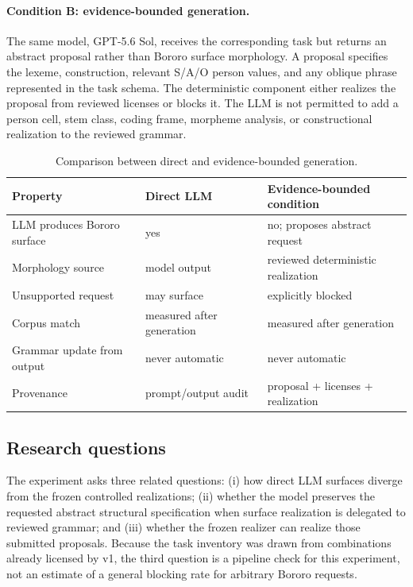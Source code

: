 \documentclass[11pt]{article}
\begin{document}
\paragraph{Condition B: evidence-bounded generation.}
The same model, GPT-5.6 Sol, receives the corresponding task but returns an
abstract proposal rather than Bororo surface morphology. A proposal specifies the lexeme,
construction, relevant S/A/O person values, and any oblique phrase represented
in the task schema. The deterministic component either realizes the proposal
from reviewed licenses or blocks it. The LLM is not permitted to add a person
cell, stem class, coding frame, morpheme analysis, or constructional realization
to the reviewed grammar.

\begin{table}[ht]
\centering
\caption{Comparison between direct and evidence-bounded generation.}
\label{tab:llmexperiment}
\begin{tabular}{p{.28\linewidth}p{.31\linewidth}p{.31\linewidth}}
\toprule
Property & Direct LLM & Evidence-bounded condition\\
\midrule
LLM produces Bororo surface & yes & no; proposes abstract request\\
Morphology source & model output & reviewed deterministic realization\\
Unsupported request & may surface & explicitly blocked\\
Corpus match & measured after generation & measured after generation\\
Grammar update from output & never automatic & never automatic\\
Provenance & prompt/output audit & proposal + licenses + realization\\
\bottomrule
\end{tabular}
\end{table}

\subsection{Research questions}

The experiment asks three related questions: (i) how direct LLM surfaces
diverge from the frozen controlled realizations; (ii) whether the model
preserves the requested abstract structural specification when surface
realization is delegated to reviewed grammar; and (iii) whether the frozen
realizer can realize those submitted proposals. Because the task inventory was
drawn from combinations already licensed by v1, the third question is a
pipeline check for this experiment, not an estimate of a general blocking rate
for arbitrary Bororo requests.
\end{document}
